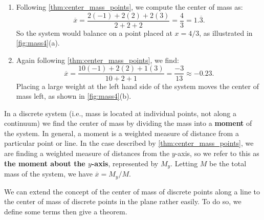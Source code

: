 {\begin{enumerate}
	\item Following \autoref{thm:center_mass_points}, we compute the center of mass as:
	$$\overline{x}=\frac{2(-1) + 2(2)+2(3)}{2+2+2} = \frac43 = 1.\overline{3}.$$
	So the system would balance on a point placed at $x=4/3$, as illustrated in \autoref{fig:mass4}(a).
	
	\item	Again following \autoref{thm:center_mass_points}, we find:
	$$\overline{x} = \frac{10(-1)+2(2)+1(3)}{10+2+1} = \frac{-3}{13} \approx -0.23.$$
	Placing a large weight at the left hand side of the system moves the center of mass left, as shown in \autoref{fig:mass4}(b).
\end{enumerate}}

In a discrete system (i.e., mass is located at individual points, not along a continuum) we find the center of mass by dividing the mass into a \textbf{moment} of the system. In general, a moment is a weighted measure of distance from a particular point or line. In the case described by \autoref{thm:center_mass_points}, we are finding a weighted measure of distances from the $y$-axis, so we refer to this as \textbf{the moment about the $y$-axis}, represented by $M_y$.  Letting $M$ be the total mass of the system, we have  $\overline{x} = M_y/M$. 

We can extend the concept of the center of mass of discrete points along a line to the center of mass of discrete points in the plane rather easily. To do so, we define some terms then give a theorem.

